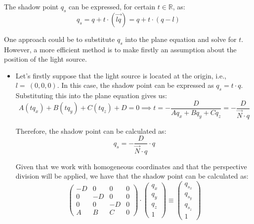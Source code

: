 The shadow point $q_s$ can be expressed, for certain $t\in \mathbb{R}$, as:
\begin{equation*}
    q_s = q + t\cdot (\vec{lq})
    = q + t\cdot (q-l)
\end{equation*}

One approach could be to substitute $q_s$ into the plane equation and solve for $t$. However, a more efficient method is to make firstly an assumption about the position of the light source.
\begin{itemize}
    \item Let's firstly suppose that the light source is located at the origin, i.e., $l=~(0,0,0)$. In this case, the shadow point can be expressed as $q_s = t\cdot q$. Substituting this into the plane equation gives us:
    \begin{equation*}
        A(tq_x) + B(tq_y) + C(tq_z) + D = 0 \implies t = -\frac{D}{Aq_x + Bq_y + Cq_z} = -\frac{D}{\vec{N}\cdot q}
    \end{equation*}

    Therefore, the shadow point can be calculated as:
    \begin{equation*}
        q_s = -\frac{D}{\vec{N}\cdot q} \cdot q
    \end{equation*}

    Given that we work with homogeneous coordinates and that the perspective division will be applied, we have that the shadow point can be calculated as:
    \begin{equation*}
        \begin{pmatrix}
            -D & 0 & 0 & 0 \\
            0 & -D & 0 & 0 \\
            0 & 0 & -D & 0 \\
            A & B & C & 0
        \end{pmatrix}
        \cdot
        \begin{pmatrix}
            q_x \\
            q_y \\
            q_z \\
            1
        \end{pmatrix}
        \equiv 
        \begin{pmatrix}
            q_{s_x} \\
            q_{s_y} \\
            q_{s_z} \\
            1
        \end{pmatrix}
    \end{equation*}


\end{itemize}
